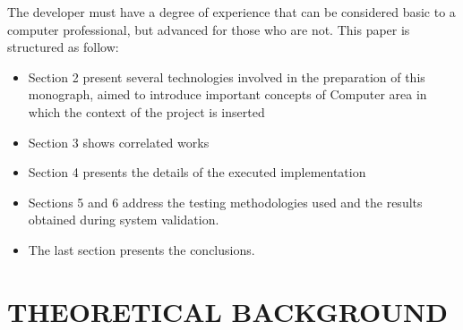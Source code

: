 \documentclass{acm_proc_article-sp}
\begin{document}
\newline
\newline
The developer must have a degree of experience that can be considered basic to a computer professional, but advanced for those who are not.
\newline This paper is structured as follow:
\begin{itemize}
\item Section 2 present several technologies involved in the preparation of this monograph, aimed to introduce important concepts of Computer area in which the context of the project is inserted
\item Section 3 shows correlated works
\item Section 4 presents the details of the executed implementation
\item Sections 5 and 6 address the testing methodologies used and the results obtained during system validation. 
\item The last section presents the conclusions.
\end{itemize}

\section{THEORETICAL BACKGROUND}
\end{document}
